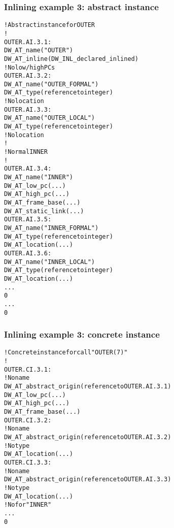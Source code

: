 \subsubsection{Inlining example 3: abstract instance}
\label{app:inliningexample3abstractinstance}
\begin{alltt}
    ! Abstract instance for OUTER
    !
OUTER.AI.3.1:
        DW\-\_AT\-\_name("OUTER")
        DW\-\_AT\-\_inline(DW\-\_INL\-\_declared\-\_inlined)
        ! No low/high PCs
OUTER.AI.3.2:
            DW\-\_AT\-\_name("OUTER\_FORMAL")
            DW\-\_AT\-\_type(reference to integer)
            ! No location
OUTER.AI.3.3:
            DW\-\_AT\-\_name("OUTER\_LOCAL")
            DW\-\_AT\-\_type(reference to integer)
            ! No location
        !
        ! Normal INNER
        !
OUTER.AI.3.4:
            DW\-\_AT\-\_name("INNER")
            DW\-\_AT\-\_low\-\_pc(...)
            DW\-\_AT\-\_high\-\_pc(...)
            DW\-\_AT\-\_frame\-\_base(...)
            DW\-\_AT\-\_static\-\_link(...)
OUTER.AI.3.5:
                DW\-\_AT\-\_name("INNER\_FORMAL")
                DW\-\_AT\-\_type(reference to integer)
                DW\-\_AT\-\_location(...)
OUTER.AI.3.6:
                DW\-\_AT\-\_name("INNER\_LOCAL")
                DW\-\_AT\-\_type(reference to integer)
                DW\-\_AT\-\_location(...)
            ...
            0
        ...
        0
\end{alltt}


\subsubsection{Inlining example 3: concrete instance}
\label{app:inliningexample3concreteinstance}
\begin{alltt}
    ! Concrete instance for call "OUTER(7)"
    !
OUTER.CI.3.1:
        ! No name
        DW\-\_AT\-\_abstract\-\_origin(reference to OUTER.AI.3.1)
        DW\-\_AT\-\_low\-\_pc(...)
        DW\-\_AT\-\_high\-\_pc(...)
        DW\-\_AT\-\_frame\-\_base(...)
OUTER.CI.3.2:
            ! No name
            DW\-\_AT\-\_abstract\-\_origin(reference to OUTER.AI.3.2)
            ! No type
            DW\-\_AT\-\_location(...)
OUTER.CI.3.3:
            ! No name
            DW\-\_AT\-\_abstract\-\_origin(reference to OUTER.AI.3.3)
            ! No type
            DW\-\_AT\-\_location(...)
        ! No  for "INNER"
        ...
        0
\end{alltt}

